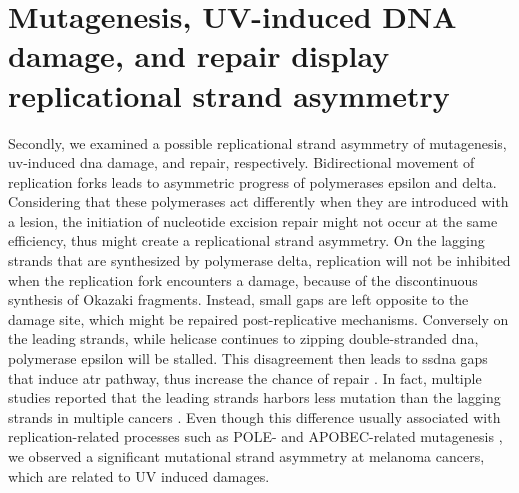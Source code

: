 \section{Mutagenesis, UV-induced DNA damage, and repair display replicational strand asymmetry}

Secondly, we examined a possible replicational strand asymmetry of mutagenesis, \gls{uv}-induced \gls{dna} damage, and repair, respectively. Bidirectional movement of replication forks leads to asymmetric progress of polymerases \gls{epsilon} and \gls{delta}. Considering that these polymerases act differently when they are introduced with a lesion, the initiation of nucleotide excision repair might not occur at the same efficiency, thus might create a replicational strand asymmetry. On the lagging strands that are synthesized by polymerase \gls{delta}, replication will not be inhibited when the replication fork encounters a damage, because of the discontinuous synthesis of Okazaki fragments. Instead, small gaps are left opposite to the damage site, which might be repaired post-replicative mechanisms. Conversely on the leading strands, while helicase continues to zipping double-stranded \gls{dna}, polymerase \gls{epsilon} will be stalled. This disagreement then leads to \gls{ssdna} gaps that induce \gls{atr} pathway, thus increase the chance of repair \citep{byun2005functional}. In fact, multiple studies reported that the leading strands harbors less mutation than the lagging strands in multiple cancers \citep{haradhvala2016mutational,lujan2012mismatch,reijns2015lagging,shinbrot2014exonuclease}. Even though this difference usually associated with replication-related processes such as POLE- and APOBEC-related mutagenesis \citep{haradhvala2016mutational}, we observed a significant mutational strand asymmetry at melanoma cancers, which are related to UV induced damages. 

